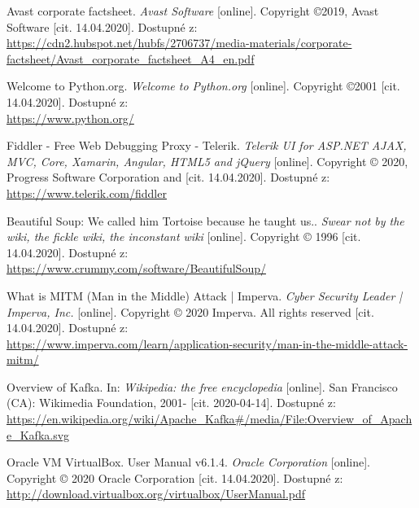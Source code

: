 \documentclass[thesis=M,czech,hidelinks]{FITthesis}[2013/05/06]
\begin{document}


\begin{thebibliography}{9}

    Avast corporate factsheet. \textit{Avast Software} [online]. Copyright ©2019, Avast Software [cit. 14.04.2020]. Dostupné z: \\       \url{https://cdn2.hubspot.net/hubfs/2706737/media-materials/corporate-factsheet/Avast_corporate_factsheet_A4_en.pdf}
       	
    
    
    Welcome to Python.org. \textit{Welcome to Python.org} [online]. Copyright ©2001 [cit. 14.04.2020]. Dostupné z: \\ 
     \url{https://www.python.org/}
    
    
    Fiddler - Free Web Debugging Proxy - Telerik. \textit{Telerik UI for ASP.NET AJAX, MVC, Core, Xamarin, Angular, HTML5 and jQuery} [online]. Copyright © 2020, Progress Software Corporation and [cit. 14.04.2020]. Dostupné z:  \\ 
    \url{https://www.telerik.com/fiddler}
    
    Beautiful Soup: We called him Tortoise because he taught us.. \textit{Swear not by the wiki, the fickle wiki, the inconstant wiki} [online]. Copyright © 1996 [cit. 14.04.2020]. Dostupné z:     \\  \url{https://www.crummy.com/software/BeautifulSoup/} 	

    
    What is MITM (Man in the Middle) Attack | Imperva. \textit{Cyber Security Leader | Imperva, Inc.} [online]. Copyright © 2020 Imperva. All rights reserved [cit. 14.04.2020]. Dostupné z:  \\ 
    \url{https://www.imperva.com/learn/application-security/man-in-the-middle-attack-mitm/}


	Overview of Kafka. In: \textit{Wikipedia: the free encyclopedia} [online]. San Francisco (CA): Wikimedia Foundation, 2001- [cit. 2020-04-14]. Dostupné z: \\ 
	\url{https://en.wikipedia.org/wiki/Apache_Kafka#/media/File:Overview_of_Apache_Kafka.svg}
	
	Oracle VM VirtualBox. User Manual v6.1.4. \textit{Oracle Corporation} [online]. Copyright © 2020 Oracle Corporation [cit. 14.04.2020]. Dostupné z: \\ 
	\url{http://download.virtualbox.org/virtualbox/UserManual.pdf}
	

\end{thebibliography}
\end{document}
